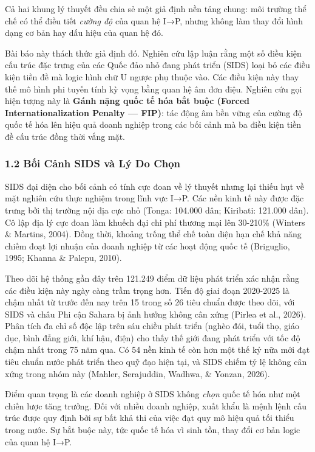 \documentclass[12pt,a4paper]{article}
\begin{document}
Cả hai khung lý thuyết đều chia sẻ một giả định nền tảng chung: môi
trường thể chế có thể điều tiết \emph{cường độ} của quan hệ I→P, nhưng
không làm thay đổi hình dạng cơ bản hay dấu hiệu của quan hệ đó.

Bài báo này thách thức giả định đó. Nghiên cứu lập luận rằng một số điều
kiện cấu trúc đặc trưng của các Quốc đảo nhỏ đang phát triển (SIDS) loại
bỏ các điều kiện tiền đề mà logic hình chữ U ngược phụ thuộc vào. Các
điều kiện này thay thế mô hình phi tuyến tính kỳ vọng bằng quan hệ âm
đơn điệu. Nghiên cứu gọi hiện tượng này là \textbf{Gánh nặng quốc tế hóa
bắt buộc (Forced Internationalization Penalty --- FIP)}: tác động âm bền
vững của cường độ quốc tế hóa lên hiệu quả doanh nghiệp trong các bối
cảnh mà ba điều kiện tiền đề cấu trúc đồng thời vắng mặt.

\hypertarget{12-bux1ed1i-cux1ea3nh-sids-vuxe0-luxfd-do-chux1ecdn}{%
\subsubsection{1.2 Bối Cảnh SIDS và Lý Do
Chọn}\label{12-bux1ed1i-cux1ea3nh-sids-vuxe0-luxfd-do-chux1ecdn}}

SIDS đại diện cho bối cảnh có tính cực đoan về lý thuyết nhưng lại thiếu
hụt về mặt nghiên cứu thực nghiệm trong lĩnh vực I→P. Các nền kinh tế
này được đặc trưng bởi thị trường nội địa cực nhỏ (Tonga: 104.000 dân;
Kiribati: 121.000 dân). Cô lập địa lý cực đoan làm khuếch đại chi phí
thương mại lên 30-210\% (Winters \& Martins, 2004). Đồng thời, khoảng
trống thể chế toàn diện hạn chế khả năng chiếm đoạt lợi nhuận của doanh
nghiệp từ các hoạt động quốc tế (Briguglio, 1995; Khanna \& Palepu,
2010).

Theo dõi hệ thống gần đây trên 121.249 điểm dữ liệu phát triển xác nhận
rằng các điều kiện này ngày càng trầm trọng hơn. Tiến độ giai đoạn
2020-2025 là chậm nhất từ trước đến nay trên 15 trong số 26 tiêu chuẩn
được theo dõi, với SIDS và châu Phi cận Sahara bị ảnh hưởng không cân
xứng (Pirlea et al., 2026). Phân tích đa chỉ số độc lập trên sáu chiều
phát triển (nghèo đói, tuổi thọ, giáo dục, bình đẳng giới, khí hậu,
điện) cho thấy thế giới đang phát triển với tốc độ chậm nhất trong 75
năm qua. Có 54 nền kinh tế còn hơn một thế kỷ nữa mới đạt tiêu chuẩn
nước phát triển theo quỹ đạo hiện tại, và SIDS chiếm tỷ lệ không cân
xứng trong nhóm này (Mahler, Serajuddin, Wadhwa, \& Yonzan, 2026).

Điểm quan trọng là các doanh nghiệp ở SIDS không \emph{chọn} quốc tế hóa
như một chiến lược tăng trưởng. Đối với nhiều doanh nghiệp, xuất khẩu là
mệnh lệnh cấu trúc được quy định bởi sự bất khả thi của việc đạt quy mô
hiệu quả tối thiểu trong nước. Sự bắt buộc này, tức quốc tế hóa vì sinh
tồn, thay đổi cơ bản logic của quan hệ I→P.
\end{document}
